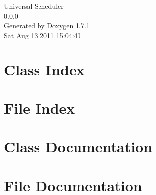 \documentclass[a4paper]{book}
\begin{document}
\hypersetup{pageanchor=false}
\begin{titlepage}
\vspace*{7cm}
\begin{center}
{\Large Universal Scheduler \\[1ex]\large 0.0.0 }\\
\vspace*{1cm}
{\large Generated by Doxygen 1.7.1}\\
\vspace*{0.5cm}
{\small Sat Aug 13 2011 15:04:40}\\
\end{center}
\end{titlepage}
\clearemptydoublepage
{}
\tableofcontents
\clearemptydoublepage
{}
\hypersetup{pageanchor=true}
\chapter{Class Index}

\chapter{File Index}

\chapter{Class Documentation}







\chapter{File Documentation}













\printindex
\end{document}
